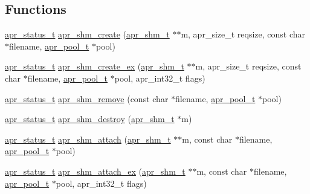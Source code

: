 \subsection*{Functions}
\begin{DoxyCompactItemize}
\item 
\hyperlink{group__apr__errno_gaf76ee4543247e9fb3f3546203e590a6c}{apr\+\_\+status\+\_\+t} \hyperlink{group__apr__shm_gac370c4943c22505ce2b0d57c51805480}{apr\+\_\+shm\+\_\+create} (\hyperlink{group__apr__shm_ga79e8c16bdeaf7ade4ef0f935249e7c2f}{apr\+\_\+shm\+\_\+t} $\ast$$\ast$m, apr\+\_\+size\+\_\+t reqsize, const char $\ast$filename, \hyperlink{group__apr__pools_gaf137f28edcf9a086cd6bc36c20d7cdfb}{apr\+\_\+pool\+\_\+t} $\ast$pool)
\item 
\hyperlink{group__apr__errno_gaf76ee4543247e9fb3f3546203e590a6c}{apr\+\_\+status\+\_\+t} \hyperlink{group__apr__shm_ga21baaa66956641e06e072501f61882e7}{apr\+\_\+shm\+\_\+create\+\_\+ex} (\hyperlink{group__apr__shm_ga79e8c16bdeaf7ade4ef0f935249e7c2f}{apr\+\_\+shm\+\_\+t} $\ast$$\ast$m, apr\+\_\+size\+\_\+t reqsize, const char $\ast$filename, \hyperlink{group__apr__pools_gaf137f28edcf9a086cd6bc36c20d7cdfb}{apr\+\_\+pool\+\_\+t} $\ast$pool, apr\+\_\+int32\+\_\+t flags)
\item 
\hyperlink{group__apr__errno_gaf76ee4543247e9fb3f3546203e590a6c}{apr\+\_\+status\+\_\+t} \hyperlink{group__apr__shm_gaee8b7d9b952ff6157ddbb00fabb477e0}{apr\+\_\+shm\+\_\+remove} (const char $\ast$filename, \hyperlink{group__apr__pools_gaf137f28edcf9a086cd6bc36c20d7cdfb}{apr\+\_\+pool\+\_\+t} $\ast$pool)
\item 
\hyperlink{group__apr__errno_gaf76ee4543247e9fb3f3546203e590a6c}{apr\+\_\+status\+\_\+t} \hyperlink{group__apr__shm_ga7de5b65a9c7d9840bfa289854f8d59d4}{apr\+\_\+shm\+\_\+destroy} (\hyperlink{group__apr__shm_ga79e8c16bdeaf7ade4ef0f935249e7c2f}{apr\+\_\+shm\+\_\+t} $\ast$m)
\item 
\hyperlink{group__apr__errno_gaf76ee4543247e9fb3f3546203e590a6c}{apr\+\_\+status\+\_\+t} \hyperlink{group__apr__shm_ga0e542941c280cb72b78e30d452464759}{apr\+\_\+shm\+\_\+attach} (\hyperlink{group__apr__shm_ga79e8c16bdeaf7ade4ef0f935249e7c2f}{apr\+\_\+shm\+\_\+t} $\ast$$\ast$m, const char $\ast$filename, \hyperlink{group__apr__pools_gaf137f28edcf9a086cd6bc36c20d7cdfb}{apr\+\_\+pool\+\_\+t} $\ast$pool)
\item 
\hyperlink{group__apr__errno_gaf76ee4543247e9fb3f3546203e590a6c}{apr\+\_\+status\+\_\+t} \hyperlink{group__apr__shm_ga088260723c96815610ff628f358d3630}{apr\+\_\+shm\+\_\+attach\+\_\+ex} (\hyperlink{group__apr__shm_ga79e8c16bdeaf7ade4ef0f935249e7c2f}{apr\+\_\+shm\+\_\+t} $\ast$$\ast$m, const char $\ast$filename, \hyperlink{group__apr__pools_gaf137f28edcf9a086cd6bc36c20d7cdfb}{apr\+\_\+pool\+\_\+t} $\ast$pool, apr\+\_\+int32\+\_\+t flags)

\end{DoxyCompactItemize}
